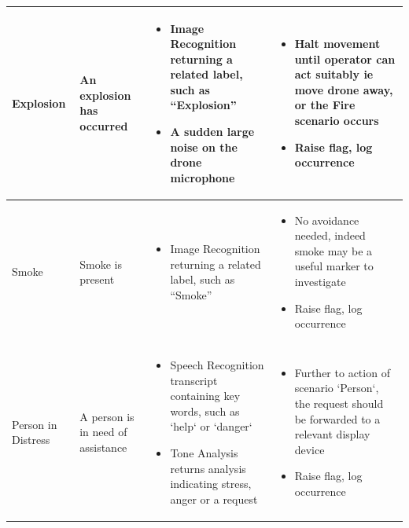 \documentclass{article}
\begin{document}
\begin{table}[h]
\begin{tabularx}{\textwidth}{| >{\centering}m{1.5cm} | >{\centering}m{2cm} | X | X |}
    Explosion & \vspace{\baselineskip} An explosion has occurred &
    \begin{itemize} [topsep=0pt, leftmargin=0cm,itemindent=.5cm,labelwidth=\itemindent,labelsep=0cm,align=left]
        \item Image Recognition returning a related label, such as “Explosion”
        \item A sudden large noise on the drone microphone
    \end{itemize} &
    \begin{itemize} [topsep=0pt, leftmargin=0cm,itemindent=.5cm,labelwidth=\itemindent,labelsep=0cm,align=left]
        \item Halt movement until operator can act suitably ie move drone away, or the Fire scenario occurs
        \item Raise flag, log occurrence
    \end{itemize} \\ \hline

    Smoke & \vspace{\baselineskip} Smoke is present &
    \begin{itemize} [topsep=0pt, leftmargin=0cm,itemindent=.5cm,labelwidth=\itemindent,labelsep=0cm,align=left]
        \item Image Recognition returning a related label, such as “Smoke”
    \end{itemize} &
    \begin{itemize} [topsep=0pt, leftmargin=0cm,itemindent=.5cm,labelwidth=\itemindent,labelsep=0cm,align=left]
        \item No avoidance needed, indeed smoke may be a useful marker to investigate
        \item Raise flag, log occurrence
    \end{itemize} \\ \hline

    Person in Distress & \vspace{\baselineskip} A person is in need of assistance &
    \begin{itemize} [topsep=0pt, leftmargin=0cm,itemindent=.5cm,labelwidth=\itemindent,labelsep=0cm,align=left]
        \item Speech Recognition transcript containing key words, such as `help` or `danger`
        \item Tone Analysis returns analysis indicating stress, anger or a request
    \end{itemize} &
    \begin{itemize} [topsep=0pt, leftmargin=0cm,itemindent=.5cm,labelwidth=\itemindent,labelsep=0cm,align=left]
        \item Further to action of scenario `Person`, the request should be forwarded to a relevant display device
        \item Raise flag, log occurrence
    \end{itemize} \\ \hline


\end{tabularx}
\end{table}
\end{document}
